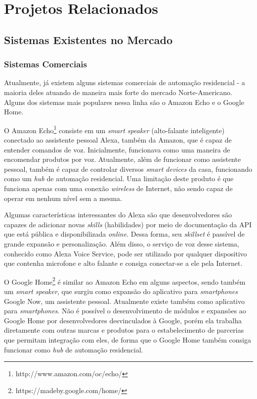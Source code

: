 \chapter{Projetos Relacionados}

\section{Sistemas Existentes no Mercado}

\subsection{Sistemas Comerciais}
Atualmente, já existem alguns sistemas comerciais de automação residencial - a maioria deles atuando de maneira mais forte do mercado Norte-Americano. Alguns dos sistemas mais populares nessa linha são o Amazon Echo e o Google Home.

O Amazon Echo\footnote{http://www.amazon.com/oc/echo/} consiste em um \textit{smart speaker} (alto-falante inteligente) conectado ao assistente pessoal Alexa, também da Amazon, que é capaz de entender comandos de voz. Inicialmente, funcionava como uma maneira de encomendar produtos por voz. Atualmente, além de funcionar como assistente pessoal, também é capaz de controlar diversos \textit{smart devices} da casa, funcionando como um \textit{hub} de automação residencial. Uma limitação deste produto é que funciona apenas com uma conexão \textit{wireless} de Internet, não sendo capaz de operar em nenhum nível sem a mesma.

Algumas características interessantes do Alexa são que desenvolvedores são capazes de adicionar novas \textit{skills} (habilidades) por meio de documentação da API que está pública e disponibilizada \textit{online}. Dessa forma, seu \textit{skillset} é passível de grande expansão e personalização. Além disso, o serviço de voz desse sistema, conhecido como Alexa Voice Service, pode ser utilizado por qualquer dispositivo que contenha microfone e alto falante e consiga conectar-se a ele pela Internet.

O Google Home\footnote{https://madeby.google.com/home/} é similar ao Amazon Echo em alguns aspectos, sendo também um \textit{smart speaker}, que surgiu como expansão do aplicativo para \textit{smartphones} Google Now, um assistente pessoal. Atualmente existe também como aplicativo para \textit{smartphones}. Não é possível o desenvolvimento de módulos e expansões ao Google Home por desenvolvedores desvinculados à Google, porém ela trabalha diretamente com outras marcas e produtos para o estabelecimento de parcerias que permitam integração com eles, de forma que o Google Home também consiga funcionar como \textit{hub} de automação residencial.

